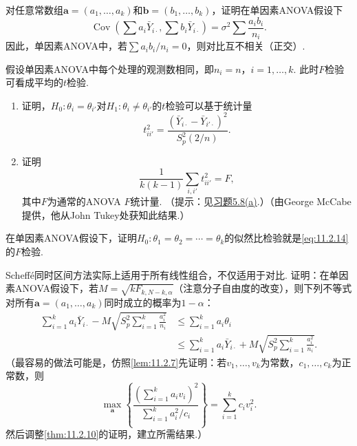 \begin{exercise}\label{exercise:11.11}
对任意常数组$\boldsymbol a=(a_1,\ldots,a_k)$和$\boldsymbol b=(b_1,\ldots,b_k)$，证明在单因素ANOVA假设下
$$\operatorname{Cov}\left(\sum a_i\bar Y_{i\cdot},\sum b_i\bar Y_{i\cdot}\right)
=\sigma^2\sum\frac{a_ib_i}{n_i}.$$
因此，单因素ANOVA中，若$\sum a_ib_i/n_i=0$，则对比互不相关（正交）.
\end{exercise}

\begin{exercise}\label{exercise:11.12}
假设单因素ANOVA中每个处理的观测数相同，即$n_i=n$，$i=1,\ldots,k$. 此时$F$检验可看成平均的$t$检验.
\begin{enumerate}[label=(\alph*)]
\item\label{item:11.12.a} 证明，$H_0:\theta_i=\theta_{i'}$对$H_1:\theta_i\ne\theta_{i'}$的$t$检验可以基于统计量
$$t_{ii'}^2=\frac{(\bar Y_{i\cdot}-\bar Y_{i'\cdot})^2}{S_p^2(2/n)}.$$
\item\label{item:11.12.b} 证明
$$\frac1{k(k-1)}\sum_{i,i'}t_{ii'}^2=F,$$
其中$F$为通常的ANOVA $F$统计量. （提示：见\hyperref[item:5.8.a]{习题5.8(a)}.）（由George McCabe提供，他从John Tukey处获知此结果.）
\end{enumerate}
\end{exercise}

\begin{exercise}\label{exercise:11.13}
在单因素ANOVA假设下，证明$H_0:\theta_1=\theta_2=\cdots=\theta_k$的似然比检验就是\eqref{eq:11.2.14}的$F$检验.
\end{exercise}

\begin{exercise}\label{exercise:11.14}
Scheff\'e同时区间方法实际上适用于所有线性组合，不仅适用于对比. 证明：在单因素ANOVA假设下，若$M=\sqrt{kF_{k,N-k,\alpha}}$（注意分子自由度的改变），则下列不等式对所有$\boldsymbol a=(a_1,\ldots,a_k)$同时成立的概率为$1-\alpha$：
$$\begin{aligned}
\sum_{i=1}^ka_i\bar Y_{i\cdot}-M\sqrt{S_p^2\sum_{i=1}^k\frac{a_i^2}{n_i}}
&\le\sum_{i=1}^ka_i\theta_i\\
&\le\sum_{i=1}^ka_i\bar Y_{i\cdot}+M\sqrt{S_p^2\sum_{i=1}^k\frac{a_i^2}{n_i}}.
\end{aligned}$$
（最容易的做法可能是，仿照\autoref{lem:11.2.7}先证明：若$v_1,\ldots,v_k$为常数，$c_1,\ldots,c_k$为正常数，则
$$\max_{\boldsymbol a}\left\{\frac{(\sum_{i=1}^ka_iv_i)^2}{\sum_{i=1}^ka_i^2/c_i}\right\}=\sum_{i=1}^kc_iv_i^2.$$
然后调整\autoref{thm:11.2.10}的证明，建立所需结果.）
\end{exercise}

